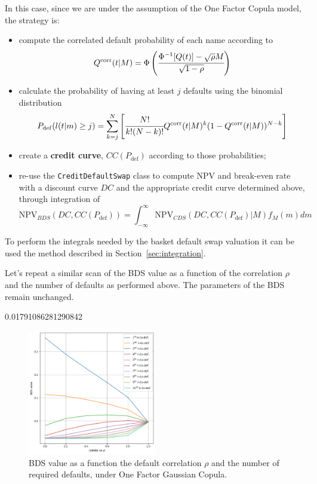 In this case, since we are under the assumption of the One Factor Copula model, the strategy is:
\begin{itemize}
\item compute the correlated default probability of each name according to 
\begin{equation}
Q^{\textrm{corr}}(t|M) = \Phi\left(\cfrac{\Phi^{-1}[Q(t)]-\sqrt{\rho} M}{\sqrt{1-\rho}}\right)
\end{equation}
\item calculate the probability of having at least $j$ defaults using the binomial distribution
\begin{equation}
P_{\mathrm{def}}(l(t|m) \ge j) = \sum_{k=j}^{N}\left[  \cfrac{N!}{k!(N-k)!}Q^{\textrm{corr}}(t|M)^k(1-Q^{\textrm{corr}}(t|M))^{N-k}\right]
\end{equation}
\item create a \textbf{credit curve}, $CC(P_{\mathrm{def}})$ according to those probabilities;
\item re-use the \texttt{CreditDefaultSwap} class to compute NPV and break-even rate with a discount curve $DC$ and the appropriate credit curve determined above, through integration of
\begin{equation}
\mathrm{NPV}_{BDS}(DC, CC(P_{\mathrm{def}})) = \int_{-\infty}^{\infty}{\mathrm{NPV}_{CDS}(DC, CC(P_{\mathrm{def}})|M) f_M(m)dm} 
\end{equation}
\end{itemize}

To perform the integrals needed by the basket default swap valuation it can be used the method described in Section~\ref{sec:integration}.


Let's repeat a similar scan of the BDS value as a function of the correlation $\rho$ and the number of defaults as performed above. The parameters of the BDS remain unchanged.

\begin{ioutput}
0.01791086281290842
\end{ioutput}

\begin{figure}[htb]
\centering
\includegraphics[width=0.5\textwidth]{figures/bds_value_one_factor}
\caption{BDS value as a function the default correlation $\rho$ and the number of required defaults, under One Factor Gaussian Copula.}
\label{fig:bds_value_one_factor}
\end{figure}

